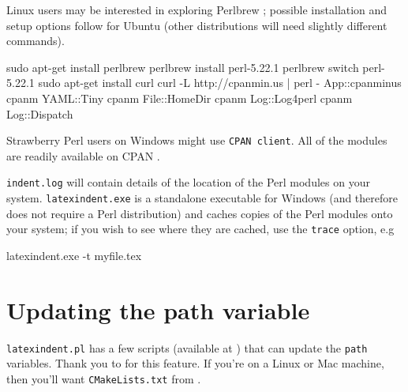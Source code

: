 		Linux users may be interested in exploring Perlbrew \cite{perlbrew}; possible installation and setup options follow for Ubuntu (other distributions will need slightly different commands).
		\begin{commandshell}
sudo apt-get install perlbrew
perlbrew install perl-5.22.1
perlbrew switch perl-5.22.1
sudo apt-get install curl
curl -L http://cpanmin.us | perl - App::cpanminus
cpanm YAML::Tiny
cpanm File::HomeDir
cpanm Log::Log4perl
cpanm Log::Dispatch
\end{commandshell}

		Strawberry Perl users on Windows might use \texttt{CPAN client}.
		All of the modules are readily available on CPAN \cite{cpan}.

		\texttt{indent.log} will contain details of the location of the Perl modules on your system.
		\texttt{latexindent.exe} is a standalone executable for Windows (and therefore does not require a Perl distribution) and caches copies of the Perl modules onto your system; if you wish to see where they are cached, use the  \texttt{trace} option, e.g \begin{dosprompt}
latexindent.exe -t myfile.tex
 \end{dosprompt} 

	\section{Updating the path variable}
	 \label{sec:updating-path} \texttt{latexindent.pl} has a few scripts (available at \cite{latexindent-home}) that can update the \texttt{path} variables.
	 Thank you to \cite{jasjuang} for this feature.
	 If you're on a Linux or Mac machine, then you'll want \texttt{CMakeLists.txt} from \cite{latexindent-home}.
